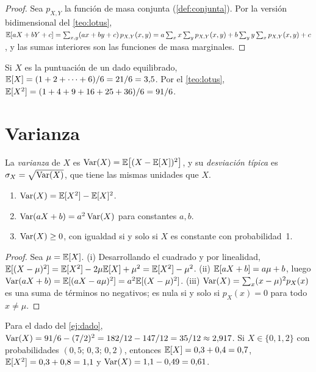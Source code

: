 \begin{proof}
Sea $p_{X,Y}$ la función de masa conjunta (\cref{def:conjunta}). Por la versión bidimensional del \cref{teo:lotus},
$\mathbb{E}[aX+bY+c]=\sum_{x,y}(ax+by+c)\,p_{X,Y}(x,y)=a\sum_x x\sum_y p_{X,Y}(x,y)+b\sum_y y\sum_x p_{X,Y}(x,y)+c$, y las sumas interiores son las funciones de masa marginales.
\end{proof}

\begin{ejemplo}\label{ej:dado}
Si $X$ es la puntuación de un dado equilibrado, $\mathbb{E}[X]=(1+2+\dots+6)/6=21/6=3{,}5$. Por el \cref{teo:lotus}, $\mathbb{E}[X^{2}]=(1+4+9+16+25+36)/6=91/6$.
\end{ejemplo}

\section{Varianza}

\begin{definicion}[Varianza]\label{def:varianza}
La \emph{varianza} de $X$ es $\operatorname{Var}(X)=\mathbb{E}\bigl[(X-\mathbb{E}[X])^{2}\bigr]$, y su \emph{desviación típica} es $\sigma_X=\sqrt{\operatorname{Var}(X)}$, que tiene las mismas unidades que $X$.
\end{definicion}

\begin{proposicion}\label{prop:varianza}
\begin{enumerate}
  \item $\operatorname{Var}(X)=\mathbb{E}[X^{2}]-\mathbb{E}[X]^{2}$.
  \item $\operatorname{Var}(aX+b)=a^{2}\operatorname{Var}(X)$ para constantes $a,b$.
  \item $\operatorname{Var}(X)\ge 0$, con igualdad si y solo si $X$ es constante con probabilidad~1.
\end{enumerate}
\end{proposicion}

\begin{proof}
Sea $\mu=\mathbb{E}[X]$. (i) Desarrollando el cuadrado y por linealidad, $\mathbb{E}[(X-\mu)^{2}]=\mathbb{E}[X^{2}]-2\mu\mathbb{E}[X]+\mu^{2}=\mathbb{E}[X^{2}]-\mu^{2}$. (ii) $\mathbb{E}[aX+b]=a\mu+b$, luego $\operatorname{Var}(aX+b)=\mathbb{E}[(aX-a\mu)^{2}]=a^{2}\mathbb{E}[(X-\mu)^{2}]$. (iii) $\operatorname{Var}(X)=\sum_x(x-\mu)^{2}p_X(x)$ es una suma de términos no negativos; es nula si y solo si $p_X(x)=0$ para todo $x\ne\mu$.
\end{proof}

\begin{ejemplo}\label{ej:tresvalores}
Para el dado del \cref{ej:dado}, $\operatorname{Var}(X)=91/6-(7/2)^{2}=182/12-147/12=35/12\approx 2{,}917$. Si $X\in\{0,1,2\}$ con probabilidades $(0{,}5;\,0{,}3;\,0{,}2)$, entonces $\mathbb{E}[X]=0{,}3+0{,}4=0{,}7$, $\mathbb{E}[X^{2}]=0{,}3+0{,}8=1{,}1$ y $\operatorname{Var}(X)=1{,}1-0{,}49=0{,}61$.
\end{ejemplo}

